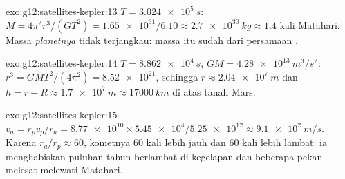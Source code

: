 \begin{solution}{exo:g12:satellites-kepler:13}
$T = \qty{3.024e5}{s}$: $M = 4\pi^2 r^3/(GT^2) =
\num{1.65e31}/6.10 \approx \qty{2.7e30}{kg} \approx 1.4$ kali Matahari. Massa
\emph{planetnya} tidak terjangkau: massa itu sudah  dari
persamaan .
\end{solution}

\begin{solution}{exo:g12:satellites-kepler:14}
$T = \qty{8.862e4}{s}$, $GM = \qty{4.28e13}{m^3/s^2}$:
$r^3 = GMT^2/(4\pi^2) = \num{8.52e21}$, sehingga $r \approx
\qty{2.04e7}{m}$ dan $h = r - R \approx \qty{1.7e7}{m} \approx
\qty{17000}{km}$ di atas tanah Mars.
\end{solution}

\begin{solution}{exo:g12:satellites-kepler:15}
$v_a = r_p v_p / r_a = \num{8.77e10} \times \num{5.45e4} /
\num{5.25e12} \approx \qty{9.1e2}{m/s}$. Karena $r_a/r_p \approx 60$,
kometnya $60$ kali lebih jauh dan $60$ kali lebih lambat: ia menghabiskan
puluhan tahun berlambat di kegelapan dan beberapa pekan melesat melewati Matahari.
\end{solution}

